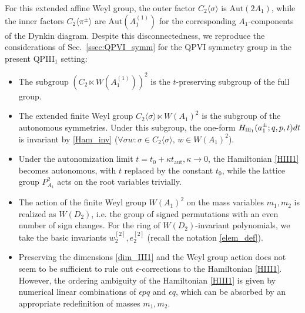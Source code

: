 \documentclass[12pt,a4paper]{article}
\numberwithin{equation}{section}
\newcommand{\III}{\scalebox{.6}{III}}
\begin{document}
For this extended affine Weyl group, the outer factor $C_2\langle\sigma\rangle$ is $\mathrm{Aut}(2A_1)$, while the inner factors $C_2\langle \pi^{\pm}\rangle$ are $\mathrm{Aut}\left(A_1^{(1)}\right)$ for the corresponding $A_1$-components of the Dynkin diagram.
Despite this disconnectedness, we reproduce the considerations of Sec.~\ref{ssec:QPVI_symm} for the QPVI symmetry group in the present QPIII$_1$ setting: 
\begin{itemize}
    \item The subgroup $\left(C_2\ltimes W\left(A_1^{(1)}\right)\right)^2$ is the $t$-preserving subgroup of the full group.
    \item The extended finite Weyl group $C_2\langle\sigma\rangle\ltimes W(A_1)^2$ is the subgroup of the autonomous symmetries. Under this subgroup, the one-form $H_{\III_1}(a_1^\pm;q,p,t)dt$ is invariant by \eqref{Ham_inv} ($\forall\sigma w: \sigma\in C_2\langle\sigma\rangle, \, w\in W(A_1)^2$).
    \item  Under the autonomization limit $t=t_0+\kappa t_{\textrm{aut}}, \kappa\rightarrow0$, the Hamiltonian \eqref{HIII1} becomes autonomous, with $t$ replaced by the constant $t_0$, while the lattice group $P_{A_1}^2$ acts on the root variables trivially. 
    \item The action of the finite Weyl group $W(A_1)^2$ on the mass variables $m_1,m_2$ is realized as $W(D_2)$, i.e. the group of signed permutations with an even number of sign changes. For the ring of $W(D_2)$-invariant polynomials, we take the basic invariants
    $w_2^{[2]},e_2^{[2]}$ (recall the notation \eqref{elem_def}).
    \item Preserving the dimensions \eqref{dim_III1} and the Weyl group action does not seem to be sufficient to rule out $\epsilon$-corrections to the Hamiltonian \eqref{HIII1}. However, the ordering ambiguity of the Hamiltonian \eqref{HIII1} is given by numerical linear combinations of $\epsilon pq$ and $\epsilon q$, which can be absorbed by an appropriate redefinition of masses $m_1, m_2$.
\end{itemize}
\end{document}

